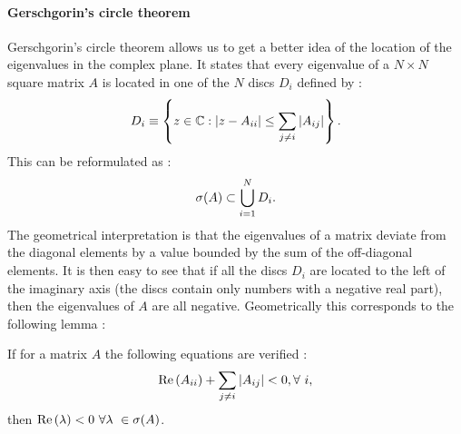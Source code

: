 \documentclass[12pt]{report}
\begin{document}
\paragraph{Gerschgorin's circle theorem}
Gerschgorin's circle theorem \cite{gerschgorin_uber_1931} allows us to get a better idea of the location of the eigenvalues in the complex plane. It states that every eigenvalue of a $N\times N$ square matrix $A$
is located in one of the $N$ discs $D_i$ defined by :
\begin{equation}
D_i\equiv \left\{z \in \mathbb{C} : \left|{z-A_{ii}}\right| \leq \sum_{j\neq i} \left|{A_{ij}}\right| \right\}. \label{eq : definition discs Gerschgorin}
\end{equation}
This can be reformulated as :
\begin{equation}
\sigma(A) \subset \bigcup_{i=1}^N D_i. \label{eq : circle theorem}
\end{equation}
The geometrical interpretation is that the eigenvalues of a matrix deviate from the diagonal elements by a value bounded by the sum of the off-diagonal elements.
It is then easy to see that if all the discs $D_i$ are located to the left of the imaginary axis (\ie the discs contain only numbers with a negative real part), then the eigenvalues of $A$ are all negative. Geometrically this corresponds to the following lemma :
\begin{lemma}\label{lemma : lemma Gerschgorin circle}
If for a matrix $A$ the following equations are verified :
\begin{equation}
\text{Re}\left(A_{ii}\right) + \sum_{j\neq i} \left|{A_{ij}}\right| < 0, \forall \ i, \label{eq : alternative version circle theorem}
\end{equation}
then $\real{\lambda} < 0 \ \forall \lambda \in \sigma(A)$.
\end{lemma}
\end{document}

